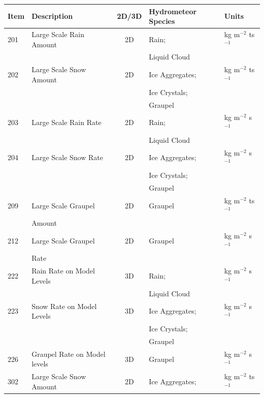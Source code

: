 \documentclass{UMDP_article}
\begin{document}
\begin{table}[h!]
\begin{center}
\begin{tabular}{|l|l|c|l|l|}
\hline
Item & Description & 2D/3D & Hydrometeor Species & Units \\
\hline
201  & Large Scale Rain Amount   & 2D & Rain;           & kg m$^{-2}$ ts$^{-1}$\\
     &                           &    & Liquid Cloud    & \\  
202  & Large Scale Snow Amount   & 2D & Ice Aggregates; &  kg m$^{-2}$ ts$^{-1}$ \\
     &                           &    & Ice Crystals;   & \\
     &                           &    & Graupel         & \\
203  & Large Scale Rain Rate     & 2D & Rain;           &  kg m$^{-2}$ s$^{-1}$\\
     &                           &    & Liquid Cloud    & \\  
204  & Large Scale Snow Rate     & 2D & Ice Aggregates; & kg m$^{-2}$ s$^{-1}$ \\
     &                           &    & Ice Crystals;   & \\
     &                           &    & Graupel         & \\
209  & Large Scale Graupel       & 2D & Graupel         & kg m$^{-2}$ ts$^{-1}$ \\
     & Amount                    &    &                 & \\
212  & Large Scale Graupel       & 2D & Graupel         & kg m$^{-2}$ s$^{-1}$ \\
     & Rate                      &    &                 & \\
222  & Rain Rate on Model Levels & 3D & Rain;           & kg m$^{-2}$ s$^{-1}$\\
     &                           &    & Liquid Cloud    & \\
223  & Snow Rate on Model Levels & 3D & Ice Aggregates; & kg m$^{-2}$ s$^{-1}$\\
     &                           &    & Ice Crystals;   & \\
     &                           &    & Graupel         & \\
226  & Graupel Rate on Model levels & 3D & Graupel & kg m$^{-2}$ s$^{-1}$\\
302  & Large Scale Snow Amount      & 2D & Ice Aggregates; & kg m$^{-2}$ ts$^{-1}$ \\

\end{tabular}
\end{center}
\end{table}
\end{document}
